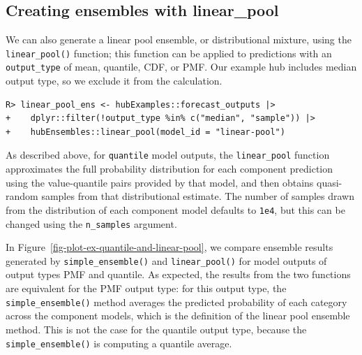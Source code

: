 \documentclass[
  article,
  shortnames,
  notitle]{jss}
\begin{document}
\subsection{Creating ensembles with
linear\_pool}\label{creating-ensembles-with-linear_pool}

We can also generate a linear pool ensemble, or distributional mixture,
using the \texttt{linear\_pool()} function; this function can be applied
to predictions with an \texttt{output\_type} of mean, quantile, CDF, or
PMF. Our example hub includes median output type, so we exclude it from
the calculation.

\begin{verbatim}
R> linear_pool_ens <- hubExamples::forecast_outputs |>
+    dplyr::filter(!output_type %in% c("median", "sample")) |>
+    hubEnsembles::linear_pool(model_id = "linear-pool")
\end{verbatim}

As described above, for \texttt{quantile} model outputs, the
\texttt{linear\_pool} function approximates the full probability
distribution for each component prediction using the value-quantile
pairs provided by that model, and then obtains quasi-random samples from
that distributional estimate. The number of samples drawn from the
distribution of each component model defaults to \texttt{1e4}, but this
can be changed using the \texttt{n\_samples} argument.

In Figure~\ref{fig-plot-ex-quantile-and-linear-pool}, we compare
ensemble results generated by \texttt{simple\_ensemble()} and
\texttt{linear\_pool()} for model outputs of output types PMF and
quantile. As expected, the results from the two functions are equivalent
for the PMF output type: for this output type, the
\texttt{simple\_ensemble()} method averages the predicted probability of
each category across the component models, which is the definition of
the linear pool ensemble method. This is not the case for the quantile
output type, because the \texttt{simple\_ensemble()} is computing a
quantile average.
\end{document}
